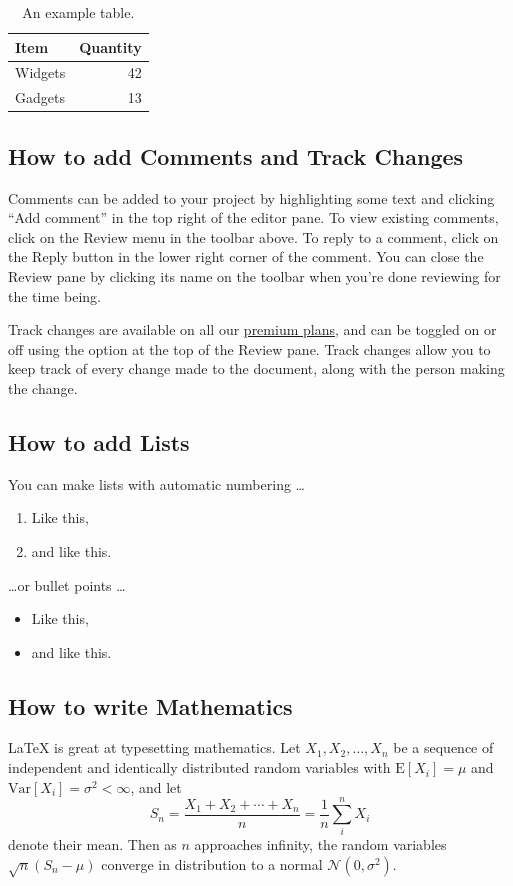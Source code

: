 \documentclass[twoside, 12pt, english,italian,latin,greek,french,spanish,brazil]{book}
\begin{document}
\begin{table}
\centering
\begin{tabular}{l|r}
Item & Quantity \\\hline
Widgets & 42 \\
Gadgets & 13
\end{tabular}
\caption{\label{tab:widgets}An example table.}
\end{table}

\subsection{How to add Comments and Track Changes}

Comments can be added to your project by highlighting some text and clicking ``Add comment'' in the top right of the editor pane. To view existing comments, click on the Review menu in the toolbar above. To reply to a comment, click on the Reply button in the lower right corner of the comment. You can close the Review pane by clicking its name on the toolbar when you're done reviewing for the time being.

Track changes are available on all our \href{https://www.overleaf.com/user/subscription/plans}{premium plans}, and can be toggled on or off using the option at the top of the Review pane. Track changes allow you to keep track of every change made to the document, along with the person making the change. 

\subsection{How to add Lists}

You can make lists with automatic numbering \dots

\begin{enumerate}
\item Like this,
\item and like this.
\end{enumerate}
\dots or bullet points \dots
\begin{itemize}
\item Like this,
\item and like this.
\end{itemize}

\subsection{How to write Mathematics}

\LaTeX{} is great at typesetting mathematics. Let $X_1, X_2, \ldots, X_n$ be a sequence of independent and identically distributed random variables with $\text{E}[X_i] = \mu$ and $\text{Var}[X_i] = \sigma^2 < \infty$, and let
\[S_n = \frac{X_1 + X_2 + \cdots + X_n}{n}
      = \frac{1}{n}\sum_{i}^{n} X_i\]
denote their mean. Then as $n$ approaches infinity, the random variables $\sqrt{n}(S_n - \mu)$ converge in distribution to a normal $\mathcal{N}(0, \sigma^2)$.
\end{document}
